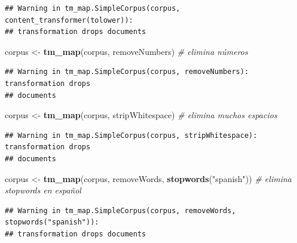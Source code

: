 \documentclass[
]{article}
\newenvironment{Shaded}{\begin{snugshade}}{\end{snugshade}}
\newcommand{\CommentTok}[1]{\textcolor[rgb]{0.56,0.35,0.01}{\textit{#1}}}
\newcommand{\FunctionTok}[1]{\textcolor[rgb]{0.13,0.29,0.53}{\textbf{#1}}}
\newcommand{\NormalTok}[1]{#1}
\newcommand{\OtherTok}[1]{\textcolor[rgb]{0.56,0.35,0.01}{#1}}
\newcommand{\StringTok}[1]{\textcolor[rgb]{0.31,0.60,0.02}{#1}}
\begin{document}
\begin{verbatim}
## Warning in tm_map.SimpleCorpus(corpus, content_transformer(tolower)):
## transformation drops documents
\end{verbatim}

\begin{Shaded}
\begin{Highlighting}[]
\NormalTok{corpus }\OtherTok{\textless{}{-}} \FunctionTok{tm\_map}\NormalTok{(corpus, removeNumbers)                        }\CommentTok{\# elimina números}
\end{Highlighting}
\end{Shaded}

\begin{verbatim}
## Warning in tm_map.SimpleCorpus(corpus, removeNumbers): transformation drops
## documents
\end{verbatim}

\begin{Shaded}
\begin{Highlighting}[]
\NormalTok{corpus }\OtherTok{\textless{}{-}} \FunctionTok{tm\_map}\NormalTok{(corpus, stripWhitespace)                      }\CommentTok{\# elimina muchos espacios}
\end{Highlighting}
\end{Shaded}

\begin{verbatim}
## Warning in tm_map.SimpleCorpus(corpus, stripWhitespace): transformation drops
## documents
\end{verbatim}

\begin{Shaded}
\begin{Highlighting}[]
\NormalTok{corpus }\OtherTok{\textless{}{-}} \FunctionTok{tm\_map}\NormalTok{(corpus, removeWords, }\FunctionTok{stopwords}\NormalTok{(}\StringTok{"spanish"}\NormalTok{))    }\CommentTok{\# elimina stopwords en español}
\end{Highlighting}
\end{Shaded}

\begin{verbatim}
## Warning in tm_map.SimpleCorpus(corpus, removeWords, stopwords("spanish")):
## transformation drops documents
\end{verbatim}
\end{document}
